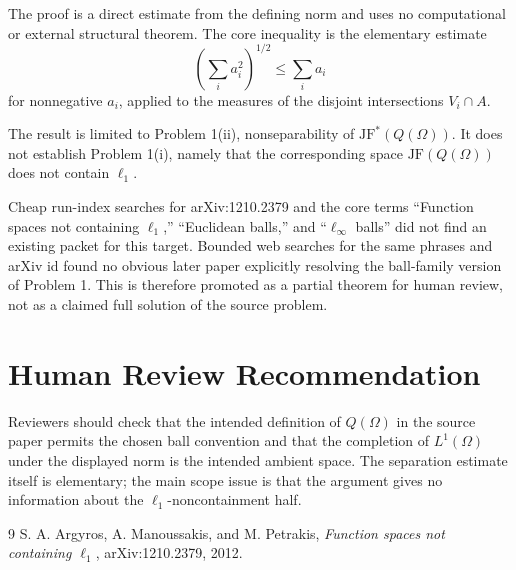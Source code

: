 \documentclass[11pt]{article}
\newcommand{\JF}{\mathrm{JF}}
\newcommand{\1}{\mathbf{1}}
\begin{document}
The proof is a direct estimate from the defining norm and uses no computational
or external structural theorem.  The core inequality is the elementary estimate
\[
\left(\sum_i a_i^2\right)^{1/2}\leq \sum_i a_i
\]
for nonnegative $a_i$, applied to the measures of the disjoint intersections
$V_i\cap A$.

The result is limited to Problem 1(ii), nonseparability of
$\JF^*(Q(\Omega))$.  It does not establish Problem 1(i), namely that the
corresponding space $\JF(Q(\Omega))$ does not contain $\ell_1$.

Cheap run-index searches for arXiv:1210.2379 and the core terms
``Function spaces not containing $\ell_1$,'' ``Euclidean balls,'' and
``$\ell_\infty$ balls'' did not find an existing packet for this target.
Bounded web searches for the same phrases and arXiv id found no obvious later
paper explicitly resolving the ball-family version of Problem 1.  This is
therefore promoted as a partial theorem for human review, not as a claimed
full solution of the source problem.

\section{Human Review Recommendation}

Reviewers should check that the intended definition of $Q(\Omega)$ in the
source paper permits the chosen ball convention and that the completion of
$L^1(\Omega)$ under the displayed norm is the intended ambient space.  The
separation estimate itself is elementary; the main scope issue is that the
argument gives no information about the $\ell_1$-noncontainment half.

\begin{thebibliography}{9}
S. A. Argyros, A. Manoussakis, and M. Petrakis,
\emph{Function spaces not containing $\ell_1$},
arXiv:1210.2379, 2012.
\end{thebibliography}
\end{document}
